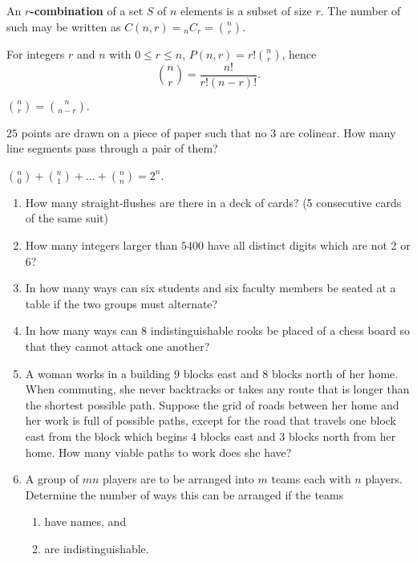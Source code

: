 \begin{definition} An \textbf{$r$-combination} of a set $S$ of $n$ elements is a subset of size $r$.  The number of such may be written as $C(n, r) = {}_n C_r = {{n}\choose{r}}$.
\end{definition}

\begin{theorem}For integers $r$ and $n$ with $0 \leq r \leq n$, $P(n, r) = r! {{n}\choose{r}}$, hence $${{n}\choose{r}} = \dfrac{n!}{r!(n-r)!}.$$
\end{theorem}

\begin{corollary} ${{n}\choose{r}} = {{n}\choose{n-r}}.$
\end{corollary}

\begin{example} $25$ points are drawn on a piece of paper such that no 3 are colinear.  How many line segments pass through a pair of them?
\end{example}

\begin{theorem} ${{n}\choose{0}} + {{n}\choose{1}} + \ldots + {{n}\choose{n}} = 2^n$.
\end{theorem}

\begin{exercises}
\begin{enumerate}
    \item How many straight-flushes are there in a deck of cards? (5 consecutive cards of the same suit)
    \item How many integers larger than $5400$ have all distinct digits which are not 2 or 6?
    \item In how many ways can six students and six faculty members be seated at a table if the two groups must alternate?
    \item In how many ways can 8 indistinguishable rooks be placed of a chess board so that they cannot attack one another?
    \item A woman works in a building 9 blocks east and 8 blocks north of her home.  When commuting, she never backtracks or takes any route that is longer than the shortest possible path.  Suppose the grid of roads between her home and her work is full of possible paths, except for the road that travels one block east from the block which begins 4 blocks east and 3 blocks north from her home.  How many viable paths to work does she have?
    \item A group of $mn$ players are to be arranged into $m$ teams each with $n$ players.  Determine the number of ways this can be arranged if the teams
    \begin{enumerate}
        \item have names, and
        \item are indistinguishable.
    \end{enumerate}
\end{enumerate}
\end{exercises}

